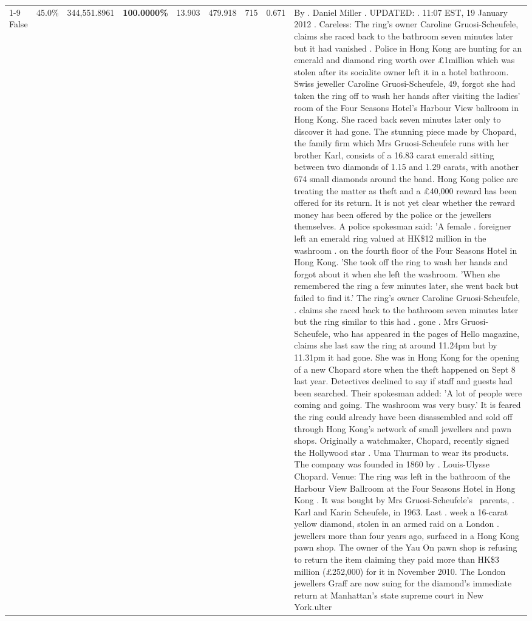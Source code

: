 \begin{table}[H]
\begin{tabular}{lllrlllll}
\cline{1-9}
False & 45.0\% & 344,551.8961 & \bfseries \color{red} 100.0000\% & 13.903 & 479.918 & 715 & 0.671 & By . Daniel Miller . UPDATED: . 11:07 EST, 19 January 2012 . Careless: The ring's owner Caroline Gruosi-Scheufele, claims she raced back to the bathroom seven minutes later but it had vanished . Police in Hong Kong are hunting for an emerald and diamond ring worth over £1million which was stolen after its socialite owner left it in a hotel bathroom. Swiss jeweller Caroline Gruosi-Scheufele, 49, forgot she had taken the ring off to wash her hands after visiting the ladies' room of the Four Seasons Hotel's Harbour View ballroom in Hong Kong. She raced back seven minutes later only to discover it had gone. The stunning piece made by Chopard, the family firm which Mrs Gruosi-Scheufele runs with her brother Karl, consists of a 16.83 carat emerald sitting between two diamonds of 1.15 and 1.29 carats, with another 674 small diamonds around the band. Hong Kong police are treating the matter as theft and a £40,000 reward has been offered for its return. It is not yet clear whether the reward money has been offered by the police or the jewellers themselves. A police spokesman said: 'A female . foreigner left an emerald ring valued at HK\$12 million in the washroom . on the fourth floor of the Four Seasons Hotel in Hong Kong. 'She took off the ring to wash her hands and forgot about it when she left the washroom. 'When she remembered the ring a few minutes later, she went back but failed to find it.' The ring's owner Caroline Gruosi-Scheufele, . claims she raced back to the bathroom seven minutes later but the ring similar to this had . gone . Mrs Gruosi-Scheufele, who has appeared in the pages of Hello magazine, claims she last saw the ring at around 11.24pm but by 11.31pm it had gone. She was in Hong Kong for the opening of a new Chopard store when the theft happened on Sept 8 last year. Detectives declined to say if staff and guests had been searched. Their spokesman added: 'A lot of people were coming and going. The washroom was very busy.' It is feared the ring could already have been disassembled and sold off through Hong Kong's network of small jewellers and pawn shops. Originally a watchmaker, Chopard, recently signed the Hollywood star . Uma Thurman to wear its products. The company was founded in 1860 by . Louis-Ulysse Chopard. Venue: The ring was left in the bathroom of the Harbour View Ballroom at the Four Seasons Hotel in Hong Kong . It was bought by Mrs Gruosi-Scheufele's  parents, . Karl and Karin Scheufele, in 1963. Last . week a 16-carat yellow diamond, stolen in an armed raid on a London . jewellers more than four years ago, surfaced in a Hong Kong pawn shop. The owner of the Yau On pawn shop is refusing to return the item claiming they paid more than HK\$3 million (£252,000) for it in November 2010. The London jewellers Graff are now suing for the diamond’s immediate return at Manhattan’s state supreme court in New York.ulter \\

\end{tabular}
\end{table}
